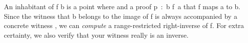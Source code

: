 An inhabitant of  \ab f  \ab b is a point \ab
where  and a proof \ab p~\as :~\ab b  \ab f~\ab a that
\ab f maps \ab a to \ab b.
Since the witness that \ab b
belongs to the image of \ab f is always accompanied by a concrete witness , we can
\emph{compute} a range-restricted right-inverse of \ab f.  For extra certainty, we also verify
that your witness really is an inverse.

\begin{code}%
%
\>[1]\AgdaSpace{}%
\AgdaSymbol{:}\AgdaSpace{}%
\AgdaSymbol{(}\AgdaSpace{}%
\AgdaSymbol{:}\AgdaSpace{}%
\AgdaSpace{}%
\AgdaSpace{}%
\AgdaSymbol{)\{}\AgdaSpace{}%
\AgdaSymbol{:}\AgdaSpace{}%
\AgdaSymbol{\}}\AgdaSpace{}%
\AgdaSpace{}%
\AgdaSpace{}%
\AgdaSpace{}%
\AgdaSpace{}%
\AgdaSpace{}%
\AgdaSpace{}%
\AgdaSpace{}%
\<%
\\
%
\>[1]\AgdaSpace{}%
\AgdaSymbol{\AgdaUnderscore{}}\AgdaSpace{}%
\AgdaSymbol{(}\AgdaSpace{}%
\AgdaSpace{}%
\AgdaSymbol{\AgdaUnderscore{})}\AgdaSpace{}%
\AgdaSymbol{=}\AgdaSpace{}%
\<%
\\
%
\\[\AgdaEmptyExtraSkip]%
%
\>[1]\AgdaSpace{}%
\AgdaSymbol{:}\AgdaSpace{}%
\AgdaSymbol{\{}\AgdaSpace{}%
\AgdaSymbol{:}\AgdaSpace{}%
\AgdaSpace{}%
\AgdaSpace{}%
\AgdaSymbol{\}\{}\AgdaSpace{}%
\AgdaSymbol{:}\AgdaSpace{}%
\AgdaSymbol{\}(}\AgdaSpace{}%
\AgdaSymbol{:}\AgdaSpace{}%
\AgdaSpace{}%
\AgdaSpace{}%
\AgdaSpace{}%
\AgdaSymbol{)}\AgdaSpace{}%
\AgdaSpace{}%
\AgdaSpace{}%
\AgdaSpace{}%
\AgdaSymbol{(}\AgdaSpace{}%
\AgdaSpace{}%
\AgdaSymbol{)}\AgdaSpace{}%
\AgdaSpace{}%
\<%
\\
%
\>[1]\AgdaSpace{}%
\AgdaSymbol{(}\AgdaSpace{}%
\AgdaSymbol{\AgdaUnderscore{}}\AgdaSpace{}%
\AgdaSymbol{)}\AgdaSpace{}%
\AgdaSymbol{=}\AgdaSpace{}%
\AgdaSpace{}%
\<%
\end{code}

